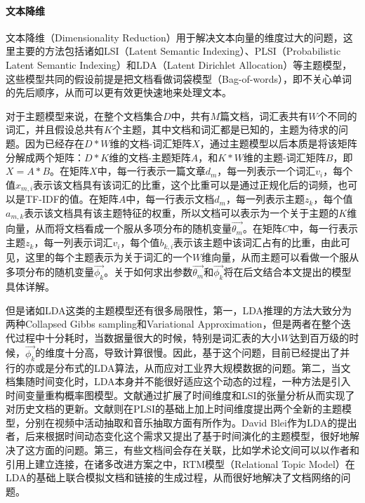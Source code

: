 \paragraph{文本降维}
文本降维（Dimensionality Reduction）用于解决文本向量的维度过大的问题，这里主要的方法包括诸如LSI（Latent Semantic Indexing）、PLSI（Probabilistic Latent Semantic Indexing）和LDA（Latent Dirichlet Allocation）\cite{blei2003latent,heinrich2005parameter}等主题模型，这些模型共同的假设前提是把文档看做词袋模型（Bag-of-words），即不关心单词的先后顺序，从而可以更有效更快速地来处理文本。

对于主题模型来说，在整个文档集合$D$中，共有$M$篇文档，词汇表共有$W$个不同的词汇，并且假设总共有$K$个主题，其中文档和词汇都是已知的，主题为待求的问题。因为已经存在$D*W$维的文档-词汇矩阵$X$，通过主题模型以后本质是将该矩阵分解成两个矩阵：$D*K$维的文档-主题矩阵$A$，和$K*W$维的主题-词汇矩阵$B$，即$X=A*B$。在矩阵$X$中，每一行表示一篇文章$d_m$，每一列表示一个词汇$v_i$，每个值$x_{m,i}$表示该文档具有该词汇的比重，这个比重可以是通过正规化后的词频，也可以是TF-IDF的值。在矩阵$A$中，每一行表示文档$d_m$，每一列表示主题$z_k$，每个值$a_{m,k}$表示该文档具有该主题特征的权重，所以文档可以表示为一个关于主题的$K$维向量，从而将文档看成一个服从多项分布的随机变量$\vec{\theta_m}$。在矩阵$C$中，每一行表示主题$z_k$，每一列表示词汇$v_i$，每个值$b_{k,i}$表示该主题中该词汇占有的比重，由此可见，这里的每个主题表示为关于词汇的一个$W$维向量，从而主题可以看做一个服从多项分布的随机变量$\vec{\phi_k}$。关于如何求出参数$\vec{\theta_m}$和$\vec{\phi_k}$将在后文结合本文提出的模型具体详解。

但是诸如LDA这类的主题模型还有很多局限性，第一，LDA推理的方法大致分为两种Collapsed Gibbs sampling\cite{heinrich2005parameter}和Variational Approximation\cite{blei2003latent}，但是两者在整个迭代过程中十分耗时，当数据量很大的时候，特别是词汇表的大小$W$达到百万级的时候，$\vec{\phi_k}$的维度十分高，导致计算很慢。因此，基于这个问题，目前已经提出了并行的亦或是分布式的LDA算法\cite{asuncion2009smoothing,smola2010architecture}，从而应对工业界大规模数据的问题。第二，当文档集随时间变化时，LDA本身并不能很好适应这个动态的过程，一种方法是引入时间变量重构概率图模型。文献\cite{deerwester1990indexing}通过扩展了时间维度和LSI的张量分析从而实现了对历史文档的更新。文献\cite{varadarajan2010probabilistic,molgaard2009temporal}则在PLSI的基础上加上时间维度提出两个全新的主题模型，分别在视频中活动抽取和音乐抽取方面有所作为。David Blei作为LDA的提出者，后来根据时间动态变化这个需求又提出了基于时间演化的主题模型\cite{blei2006dynamic}，很好地解决了这方面的问题。第三，有些文档间会存在关联，比如学术论文间可以以作者和引用上建立连接，在诸多改进方案之中，RTM模型（Relational Topic Model）\cite{chang2009relational}在LDA的基础上联合模拟文档和链接的生成过程，从而很好地解决了文档网络的问题。

